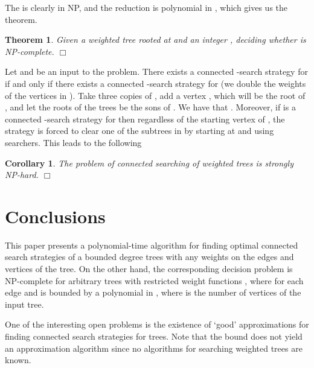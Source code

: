 \documentclass[10pt]{article}
\newcommand{\qed}{\hspace*{\fill}\nolinebreak\ensuremath{\Box}}
\newtheorem{theorem}{Theorem}
\newtheorem{corollary}{Corollary}
\begin{document}
The  is clearly in NP, and the reduction is polynomial in , which gives us the theorem.
\begin{theorem} \label{thm:csf_hard}
Given a weighted tree  rooted at  and an integer , deciding whether  is \textup{NP}-complete.
\qed
\end{theorem}
Let  and  be an input to the  problem. There exists a connected -search strategy for  if and only if there exists a connected -search strategy for  (we double the weights of the vertices in ). Take three copies of , add a vertex , which will be the root of , and let the roots of the trees  be the sons of . We have that . Moreover, if  is a connected -search strategy for  then regardless of the starting vertex of , the strategy is forced to clear one of the subtrees  in  by starting at  and using  searchers. This leads to the following
\begin{corollary} \label{cor:cs_hard}
The problem of connected searching of weighted trees is strongly \textup{NP}-hard.
\qed
\end{corollary}




\section{Conclusions}
\label{sec:conclusions}

This paper presents a polynomial-time algorithm for finding optimal connected search strategies of a bounded degree trees with any weights on the edges and vertices of the tree. On the other hand, the corresponding decision problem is NP-complete for arbitrary trees with restricted weight functions , where  for each edge  and  is bounded by a polynomial in , where  is the number of vertices of the input tree.

One of the interesting open problems is the existence of `good' approximations for finding connected search strategies for trees. Note that the bound  \cite{connected_weighted_trees} does not yield an approximation algorithm since no algorithms for searching weighted trees are known.





\end{document}
